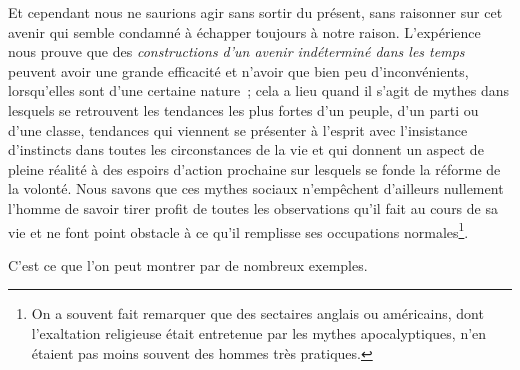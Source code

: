 \documentclass[french,twoside]{book} %
\begin{document}
Et cependant nous ne saurions agir sans sortir du présent, sans raisonner sur cet avenir qui semble condamné à échapper toujours à notre raison. L’expérience nous prouve que des \emph{constructions d’un avenir indéterminé dans les temps} peuvent avoir une grande efficacité et n’avoir que bien peu d’inconvénients, lorsqu’elles sont d’une certaine nature ; cela a lieu quand il s’agit de mythes dans lesquels se retrouvent les tendances les plus fortes d’un peuple, d’un parti ou d’une classe, tendances qui viennent se présenter à l’esprit avec l’insistance d’instincts dans toutes les circonstances de la vie et qui donnent un aspect de pleine réalité à des espoirs d’action prochaine sur lesquels se fonde la réforme de la volonté. Nous savons que ces mythes sociaux  n’empêchent d’ailleurs nullement l’homme de savoir tirer profit de toutes les observations qu’il fait au cours de sa vie et ne font point obstacle à ce qu’il remplisse ses occupations normales\footnote{ \noindent On a souvent fait remarquer que des sectaires anglais ou américains, dont l’exaltation religieuse était entretenue par les mythes apocalyptiques, n’en étaient pas moins souvent des hommes très pratiques.
 }.\par
C’est ce que l’on peut montrer par de nombreux exemples.\par
\end{document}
